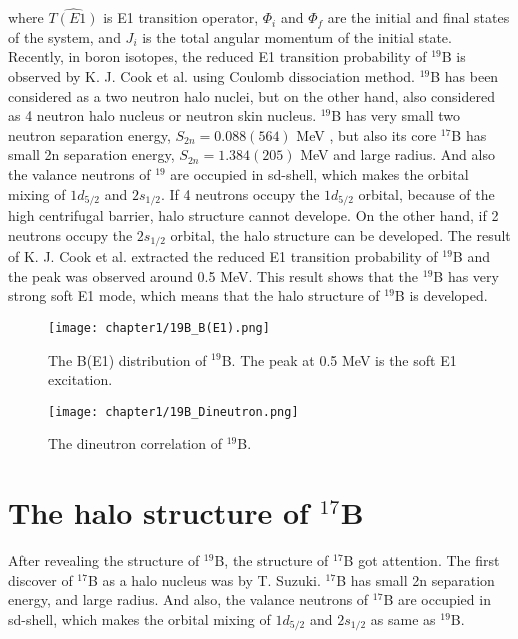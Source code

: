 where $\hat{T(E1)}$ is E1 transition operator, $\Phi_i$ and $\Phi_f$ are the initial and final states of the system, and $J_i$ is the total angular momentum of the initial state.
Recently, in boron isotopes, the reduced E1 transition probability of ${}^{19}$B is observed by K. J. Cook et al.\cite{KJCook} using Coulomb dissociation method. ${}^{19}$B has been considered as a two neutron halo nuclei, but on the other hand, also considered as 4 neutron halo nucleus or neutron skin nucleus. ${}^{19}$B has very small two neutron separation energy, $S_{2n} = 0.088(564)$ MeV \cite{Wang19B}, but also its core ${}^{17}$B has small 2n separation energy, $S_{2n} = 1.384(205)$ MeV and large radius\cite{Suzuki99}. And also the valance neutrons of ${}^{19}$ are occupied in sd-shell, which makes the orbital mixing of $1d_{5/2}$ and $2s_{1/2}$. If 4 neutrons occupy the $1d_{5/2}$ orbital, because of the high centrifugal barrier, halo structure cannot develope. On the other hand, if 2 neutrons occupy the $2s_{1/2}$ orbital, the halo structure can be developed. The result of K. J. Cook et al. extracted the reduced E1 transition probability of ${}^{19}$B and the peak was observed around 0.5 MeV. This result shows that the ${}^{19}$B has very strong soft E1 mode, which means that the halo structure of ${}^{19}$B is developed.

\begin{figure}[t]
    \centering
    \texttt{[image: chapter1/19B\_B(E1).png]}
    \caption{The B(E1) distribution of ${}^{19}$B. The peak at 0.5 MeV is the soft E1 excitation.}
\end{figure}

\begin{figure}
    \centering
    \texttt{[image: chapter1/19B\_Dineutron.png]}
    \caption{The dineutron correlation of ${}^{19}$B.}
\end{figure}

\section{The halo structure of ${}^{17}$B}

After revealing the structure of ${}^{19}$B, the structure of ${}^{17}$B got attention. The first discover of ${}^{17}$B as a halo nucleus was by T. Suzuki.\cite{Suzuki99} ${}^{17}$B has small 2n separation energy, and large radius. And also, the valance neutrons of ${}^{17}$B are occupied in sd-shell, which makes the orbital mixing of $1d_{5/2}$ and $2s_{1/2}$ as same as ${}^{19}$B. 


